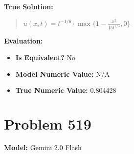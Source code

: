 \documentclass{article}
\begin{document}
\textbf{True Solution:}
\begin{quote}
$u(x,t)=t^{-1/6}\cdot\max\{1-\frac{x^2}{15t^{1/3}},0\}$
\end{quote}

\textbf{Evaluation:}
\begin{itemize}
\item \textbf{Is Equivalent?} No
\item \textbf{Model Numeric Value:} N/A
\item \textbf{True Numeric Value:} 0.804428
\end{itemize}
\vspace{1cm}
\section*{Problem 519}
\textbf{Model:} Gemini 2.0 Flash
\end{document}
